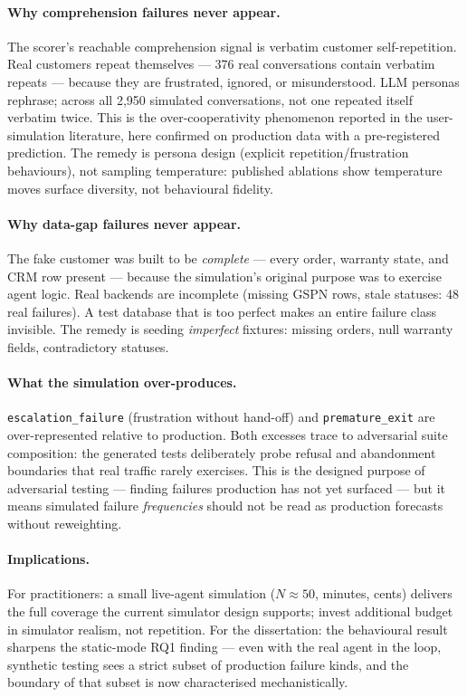 \documentclass[11pt,a4paper]{article}
\newcommand{\cat}[1]{\texttt{#1}}
\begin{document}
\paragraph{Why comprehension failures never appear.}
The scorer's reachable comprehension signal is verbatim customer self-repetition. Real customers
repeat themselves --- 376 real conversations contain verbatim repeats --- because they are
frustrated, ignored, or misunderstood. LLM personas rephrase; across all 2{,}950 simulated
conversations, not one repeated itself verbatim twice. This is the over-cooperativity
phenomenon reported in the user-simulation literature, here confirmed on production data with a
pre-registered prediction. The remedy is persona design (explicit repetition/frustration
behaviours), not sampling temperature: published ablations show temperature moves surface
diversity, not behavioural fidelity.

\paragraph{Why data-gap failures never appear.}
The fake customer was built to be \emph{complete} --- every order, warranty state, and CRM row
present --- because the simulation's original purpose was to exercise agent logic. Real backends
are incomplete (missing GSPN rows, stale statuses: 48 real failures). A test database that is
too perfect makes an entire failure class invisible. The remedy is seeding \emph{imperfect}
fixtures: missing orders, null warranty fields, contradictory statuses.

\paragraph{What the simulation over-produces.}
\cat{escalation\_failure} (frustration without hand-off) and \cat{premature\_exit} are
over-represented relative to production. Both excesses trace to adversarial suite composition:
the generated tests deliberately probe refusal and abandonment boundaries that real traffic
rarely exercises. This is the designed purpose of adversarial testing --- finding failures
production has not yet surfaced --- but it means simulated failure \emph{frequencies} should not
be read as production forecasts without reweighting.

\paragraph{Implications.}
For practitioners: a small live-agent simulation ($N\!\approx\!50$, minutes, cents) delivers the
full coverage the current simulator design supports; invest additional budget in simulator
realism, not repetition. For the dissertation: the behavioural result sharpens the static-mode
RQ1 finding --- even with the real agent in the loop, synthetic testing sees a strict subset of
production failure kinds, and the boundary of that subset is now characterised mechanistically.
\end{document}
